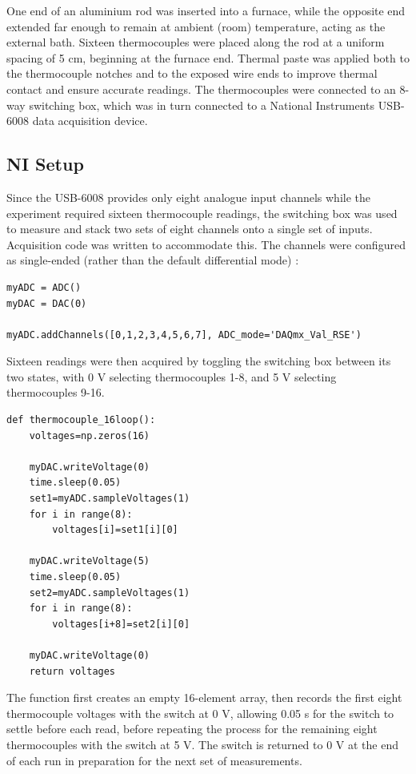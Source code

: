\documentclass[11pt, a4paper, twocolumn]{article}
\begin{document}
One end of an aluminium rod was inserted into a furnace, while the opposite end extended far enough to remain at ambient (room) temperature, acting as the external bath. Sixteen thermocouples were placed along the rod at a uniform spacing of 5 cm, beginning at the furnace end. Thermal paste was applied both to the thermocouple notches and to the exposed wire ends to improve thermal contact and ensure accurate readings. The thermocouples were connected to an 8-way switching box, which was in turn connected to a National Instruments USB-6008 data acquisition device.

\subsection{NI Setup}

Since the USB-6008 provides only eight analogue input channels while the experiment required sixteen thermocouple readings, the switching box was used to measure and stack two sets of eight channels onto a single set of inputs. Acquisition code was written to accommodate this. The channels were configured as single-ended (rather than the default differential mode) \cite{ucd2026niusb6008}:

\begin{lstlisting}
myADC = ADC()
myDAC = DAC(0)

myADC.addChannels([0,1,2,3,4,5,6,7], ADC_mode='DAQmx_Val_RSE')
\end{lstlisting}

Sixteen readings were then acquired by toggling the switching box between its two states, with 0 V selecting thermocouples 1-8, and 5 V selecting thermocouples 9-16.

\begin{lstlisting}
def thermocouple_16loop():
    voltages=np.zeros(16)

    myDAC.writeVoltage(0)
    time.sleep(0.05)
    set1=myADC.sampleVoltages(1)
    for i in range(8):
        voltages[i]=set1[i][0]

    myDAC.writeVoltage(5)
    time.sleep(0.05)
    set2=myADC.sampleVoltages(1)
    for i in range(8):
        voltages[i+8]=set2[i][0]

    myDAC.writeVoltage(0)
    return voltages
\end{lstlisting}

The function first creates an empty 16-element array, then records the first eight thermocouple voltages with the switch at 0 V, allowing 0.05 s for the switch to settle before each read, before repeating the process for the remaining eight thermocouples with the switch at 5 V. The switch is returned to 0 V at the end of each run in preparation for the next set of measurements.
\end{document}
